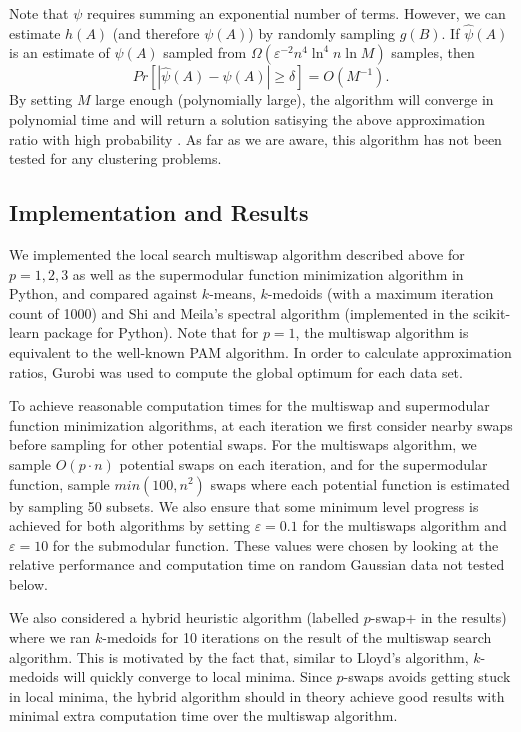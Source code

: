 \documentclass{article}
\begin{document}
Note that $\psi$ requires summing an exponential number of terms. However, we can estimate $h(A)$ (and therefore $\psi(A)$) by randomly sampling $g(B)$. If $\hat{\psi}(A)$ is an estimate of $\psi(A)$ sampled from $\Omega (\varepsilon^{-2} n^4 \ln^4 n \ln M)$ samples, then 
\[ Pr[ | \hat{\psi}(A) - \psi(A) | \geq \delta ] = O(M^{-1}). \]
By setting $M$ large enough (polynomially large), the algorithm will converge in polynomial time and will return a solution satisying the above approximation ratio with high probability \cite{Sviridenko}. As far as we are aware, this algorithm has not been tested for any clustering problems. 
 
\subsection{Implementation and Results}

We implemented the local search multiswap algorithm described above for $p=1, 2, 3$ as well as the supermodular function minimization algorithm in Python, and compared against $k$-means, $k$-medoids (with a maximum iteration count of 1000) and Shi and Meila's spectral algorithm (implemented in the scikit-learn package for Python). Note that for $p=1$, the multiswap algorithm is equivalent to the well-known PAM algorithm.  In order to calculate approximation ratios, Gurobi was used to compute the global optimum for each data set.

To achieve reasonable computation times for the multiswap and supermodular function minimization algorithms, at each iteration we first consider nearby swaps before sampling for other potential swaps. For the multiswaps algorithm, we sample $O(p\cdot n)$ potential swaps on each iteration, and for the supermodular function, sample $min(100,n^2)$ swaps where each potential function is estimated by sampling 50 subsets. We also ensure that some minimum level progress is achieved for both algorithms by setting $\varepsilon = 0.1$ for the multiswaps algorithm and $\varepsilon = 10$ for the submodular function. These values were chosen by looking at the relative performance and computation time on random Gaussian data not tested below.

We also considered a hybrid heuristic algorithm (labelled $p$-swap+ in the results) where we ran $k$-medoids for 10 iterations on the result of the multiswap search algorithm.  This is motivated by the fact that, similar to Lloyd's algorithm, $k$-medoids will quickly converge to local minima.  Since $p$-swaps avoids getting stuck in local minima, the hybrid algorithm should in theory achieve good results with minimal extra computation time over the multiswap algorithm.
\end{document}
